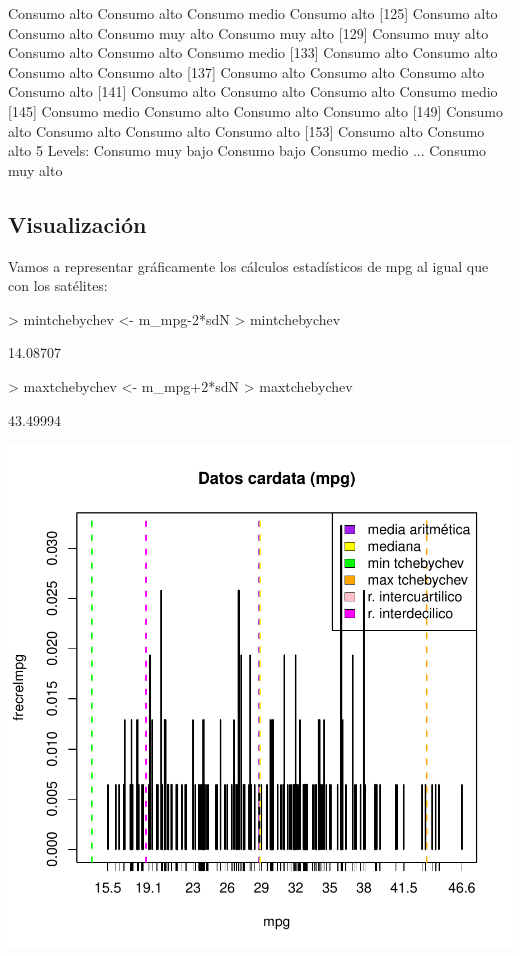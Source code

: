 \documentclass [a4paper] {article}
\begin{document}
\begin{Schunk}
\begin{Soutput}
[121] Consumo alto     Consumo alto     Consumo medio    Consumo alto    
[125] Consumo alto     Consumo alto     Consumo muy alto Consumo muy alto
[129] Consumo muy alto Consumo alto     Consumo alto     Consumo medio   
[133] Consumo alto     Consumo alto     Consumo alto     Consumo alto    
[137] Consumo alto     Consumo alto     Consumo alto     Consumo alto    
[141] Consumo alto     Consumo alto     Consumo alto     Consumo medio   
[145] Consumo medio    Consumo alto     Consumo alto     Consumo alto    
[149] Consumo alto     Consumo alto     Consumo alto     Consumo alto    
[153] Consumo alto     Consumo alto    
5 Levels: Consumo muy bajo Consumo bajo Consumo medio ... Consumo muy alto
\end{Soutput}
\end{Schunk}

\subsection{Visualización}
Vamos a representar gráficamente los cálculos estadísticos de mpg al igual que con los satélites:

\begin{Schunk}
\begin{Sinput}
> mintchebychev <- m_mpg-2*sdN
> mintchebychev
\end{Sinput}
\begin{Soutput}
[1] 14.08707
\end{Soutput}
\begin{Sinput}
> maxtchebychev <- m_mpg+2*sdN
> maxtchebychev
\end{Sinput}
\begin{Soutput}
[1] 43.49994
\end{Soutput}
\end{Schunk}
\includegraphics{Grupo.1-PL1-Figura 2}
\end{document}
